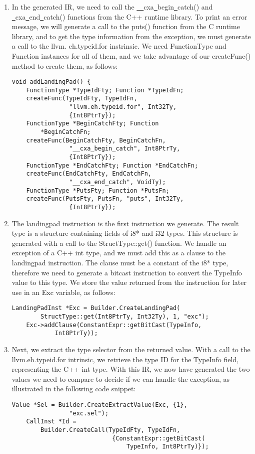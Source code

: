 \begin{enumerate}
\item In the generated IR, we need to call the \underline{~~}cxa\underline{~}begin\underline{~}catch() and \underline{~}cxa\underline{~}end\underline{~}catch() functions from the C++ runtime library. To print an error message, we will generate a call to the puts() function from the C runtime library, and to get the type information from the exception, we must generate a call to the llvm. eh.typeid.for instrinsic. We need FunctionType and Function instances for all of them, and we take advantage of our createFunc() method to create them, as follows:
\begin{lstlisting}[caption={}]
void addLandingPad() {
	FunctionType *TypeIdFty; Function *TypeIdFn;
	createFunc(TypeIdFty, TypeIdFn,
				"llvm.eh.typeid.for", Int32Ty,
				{Int8PtrTy});
	FunctionType *BeginCatchFty; Function 
		*BeginCatchFn;
	createFunc(BeginCatchFty, BeginCatchFn,
				"__cxa_begin_catch", Int8PtrTy,
				{Int8PtrTy});
	FunctionType *EndCatchFty; Function *EndCatchFn;
	createFunc(EndCatchFty, EndCatchFn,
				"__cxa_end_catch", VoidTy);
	FunctionType *PutsFty; Function *PutsFn;
	createFunc(PutsFty, PutsFn, "puts", Int32Ty,
				{Int8PtrTy});
\end{lstlisting}

\item The landingpad instruction is the first instruction we generate. The result type is a structure containing fields of i8* and i32 types. This structure is generated with a call to the StructType::get() function. We handle an exception of a C++ int type, and we must add this as a clause to the landingpad instruction. The clause must be a constant of the i8* type, therefore we need to generate a bitcast instruction to convert the TypeInfo value to this type. We store the value returned from the instruction for later use in an Exc variable, as follows:
\begin{lstlisting}[caption={}]
	LandingPadInst *Exc = Builder.CreateLandingPad(
		StructType::get(Int8PtrTy, Int32Ty), 1, "exc");
	Exc->addClause(ConstantExpr::getBitCast(TypeInfo, 
			Int8PtrTy));
\end{lstlisting}

\item Next, we extract the type selector from the returned value. With a call to the llvm.eh.typeid.for intrinsic, we retrieve the type ID for the TypeInfo field, representing the C++ int type. With this IR, we now have generated the two values we need to compare to decide if we can handle the exception, as illustrated in the following code snippet:
\begin{lstlisting}[caption={}]
	Value *Sel = Builder.CreateExtractValue(Exc, {1}, 
				"exc.sel");
	CallInst *Id =
		Builder.CreateCall(TypeIdFty, TypeIdFn,
							{ConstantExpr::getBitCast(
								TypeInfo, Int8PtrTy)});
\end{lstlisting}


\end{enumerate}
